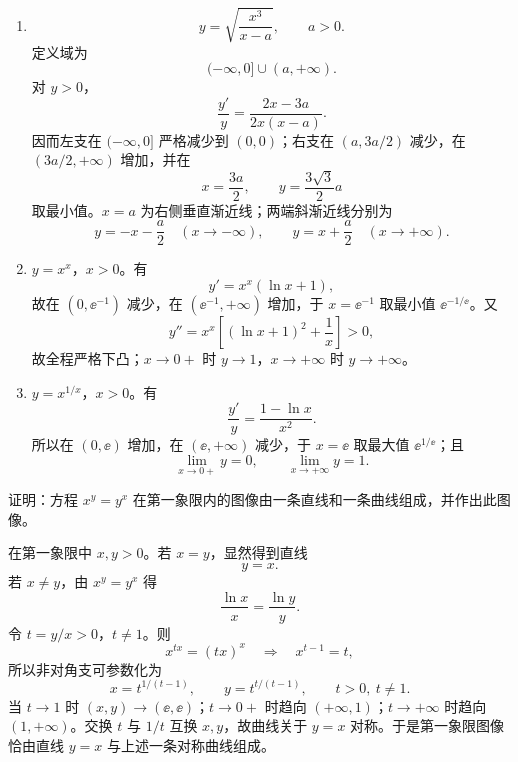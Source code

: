 \begin{xsolution}
\begin{enumerate}[label=(\arabic*)]
  \item
  \[
    y=\sqrt{\frac{x^3}{x-a}},\qquad a>0.
  \]
  定义域为
  \[
    (-\infty,0]\cup(a,+\infty).
  \]
  对 $y>0$，
  \[
    \frac{y'}y=\frac{2x-3a}{2x(x-a)}.
  \]
  因而左支在 $(-\infty,0]$ 严格减少到 $(0,0)$；右支在 $(a,3a/2)$ 减少，在 $(3a/2,+\infty)$ 增加，并在
  \[
    x=\frac{3a}{2},\qquad y=\frac{3\sqrt3}{2}a
  \]
  取最小值。$x=a$ 为右侧垂直渐近线；两端斜渐近线分别为
  \[
    y=-x-\frac a2\quad(x\to-\infty),
    \qquad
    y=x+\frac a2\quad(x\to+\infty).
  \]

  \item $y=x^x$，$x>0$。有
  \[
    y'=x^x(\ln x+1),
  \]
  故在 $(0,\ee^{-1})$ 减少，在 $(\ee^{-1},+\infty)$ 增加，于 $x=\ee^{-1}$ 取最小值 $\ee^{-1/\ee}$。又
  \[
    y''=x^x\left[(\ln x+1)^2+\frac1x\right]>0,
  \]
  故全程严格下凸；$x\to0+$ 时 $y\to1$，$x\to+\infty$ 时 $y\to+\infty$。

  \item $y=x^{1/x}$，$x>0$。有
  \[
    \frac{y'}y=\frac{1-\ln x}{x^2}.
  \]
  所以在 $(0,\ee)$ 增加，在 $(\ee,+\infty)$ 减少，于 $x=\ee$ 取最大值 $\ee^{1/\ee}$；且
  \[
    \lim_{x\to0+}y=0,
    \qquad
    \lim_{x\to+\infty}y=1.
  \]
\end{enumerate}
\end{xsolution}


\begin{xexercise}[4]
证明：方程 $x^y=y^x$ 在第一象限内的图像由一条直线和一条曲线组成，并作出此图像。
\end{xexercise}
\begin{xsolution}
在第一象限中 $x,y>0$。若 $x=y$，显然得到直线
\[
  y=x.
\]
若 $x\ne y$，由 $x^y=y^x$ 得
\[
  \frac{\ln x}{x}=\frac{\ln y}{y}.
\]
令 $t=y/x>0$，$t\ne1$。则
\[
  x^{tx}=(tx)^x
  \quad\Longrightarrow\quad
  x^{t-1}=t,
\]
所以非对角支可参数化为
\[
  \boxed{x=t^{1/(t-1)},\qquad y=t^{t/(t-1)},\qquad t>0,\ t\ne1.}
\]
当 $t\to1$ 时 $(x,y)\to(\ee,\ee)$；$t\to0+$ 时趋向 $(+\infty,1)$；$t\to+\infty$ 时趋向 $(1,+\infty)$。交换 $t$ 与 $1/t$ 互换 $x,y$，故曲线关于 $y=x$ 对称。于是第一象限图像恰由直线 $y=x$ 与上述一条对称曲线组成。
\end{xsolution}


